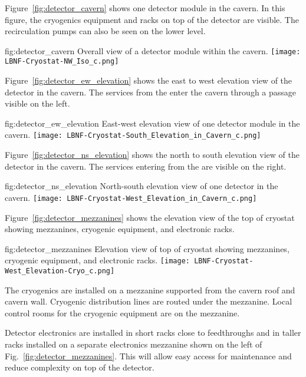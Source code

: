 Figure~\ref{fig:detector_cavern} shows one detector module in the
cavern. In this figure, the cryogenics equipment and racks on top of
the detector are visible. The  recirculation pumps can also be seen
on the lower level.
\begin{dunefigure}{fig:detector_cavern}
  {Overall view of a detector module within the cavern.}
  \texttt{[image: LBNF-Cryostat-NW\_Iso\_c.png]}
\end{dunefigure}

Figure~\ref{fig:detector_ew_elevation} shows the east to west
elevation view of the detector in the cavern. The services from the
 enter the cavern through a passage visible on the left.
\begin{dunefigure}{fig:detector_ew_elevation}
  {East-west elevation view of one detector module in the cavern.}
  \texttt{[image: LBNF-Cryostat-South\_Elevation\_in\_Cavern\_c.png]}
\end{dunefigure}

Figure~\ref{fig:detector_ns_elevation} shows the north to south
elevation view of the detector in the cavern. The services entering
from the  are visible on the right.
\begin{dunefigure}{fig:detector_ns_elevation}
  {North-south elevation view of one detector in the cavern.}
  \texttt{[image: LBNF-Cryostat-West\_Elevation\_in\_Cavern\_c.png]}
\end{dunefigure}

Figure~\ref{fig:detector_mezzanines} shows the elevation view of the
top of cryostat showing mezzanines, cryogenic equipment, and
electronic racks.
\begin{dunefigure}{fig:detector_mezzanines}
  {Elevation view of top of cryostat showing mezzanines, cryogenic
    equipment, and electronic racks.}
  \texttt{[image: LBNF-Cryostat-West\_Elevation-Cryo\_c.png]}
\end{dunefigure}
The cryogenics are installed on a mezzanine supported from
the cavern roof and cavern wall. Cryogenic distribution lines are
routed under the mezzanine. Local control rooms for the
cryogenic equipment are on the mezzanine.

Detector electronics are installed in short racks close to
feedthroughs and in taller racks installed on a separate electronics
mezzanine shown on the left of Fig.~\ref{fig:detector_mezzanines}.
This will allow easy access for maintenance and reduce complexity on
top of the detector.

